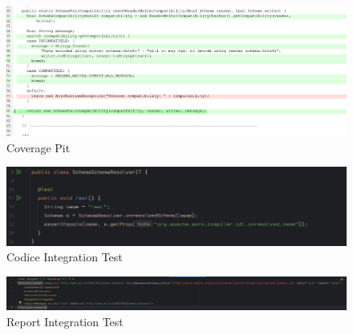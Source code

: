\documentclass[12pt, a4paper]{article}
\begin{document}
  \begin{figure}
    \includegraphics[width=\linewidth]{./images/schema_compatibiity/PitCoverage1.png}
    \caption{Coverage Pit}
    \label{fig:PitMutationSchemaCompatibility1}
  \end{figure}

  \begin{figure}
    \includegraphics[width=\linewidth]{./images/integration_test/IntegrationTest.png}
    \caption{Codice Integration Test}
    \label{fig:CodeIntegrationTest}
  \end{figure}

  \begin{figure}
    \includegraphics[width=\linewidth]{./images/integration_test/FailsafeReport.png}
    \caption{Report Integration Test}
    \label{fig:ReportIntegrationTest}
  \end{figure}

  
\end{document}
